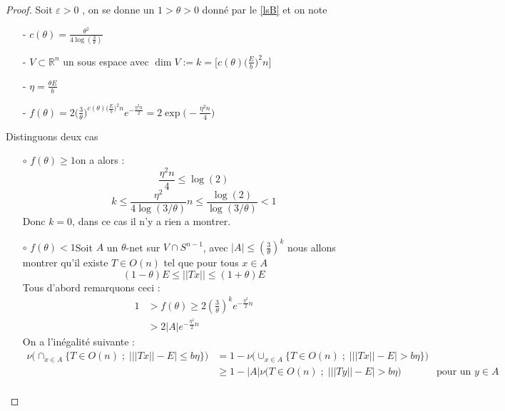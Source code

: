 \documentclass[12pt]{article}
\begin{document}
\begin{proof}
	Soit $\varepsilon>0$ , on se donne un $1>\theta>0$ donné par le \ref{lsB} et on note
	\begin{enumerate}
		\item[-] $c(\theta) = \frac{\theta^2}{4\log(\frac{3}{\theta})} $
		\item[-] $V\subset \mathbb{R}^n$ un sous espace avec $\dim V := k = \big[c(\theta)\big(\frac{E}{b}\big)^2n\big] $
		\item[-] $\eta = \frac{\theta E}{b}$
		\item[-] $f(\theta)=2\big(\frac{3}{\theta}\big)^{c(\theta)\big(\frac{E}{b}\big)^2n}e^{-\frac{\eta^2 n}{2}}=2\exp\big(-\frac{\eta^2n}{4}\big)$
	\end{enumerate}
	
	Distinguons deux cas 
	\begin{enumerate}[leftmargin=\labelsep]
		\item[$\circ$] {$f(\theta)\geq1$}\newline on a alors :
		\begin{equation*}
		\frac{\eta^2n}{4}\leq \log(2)
		\end{equation*}
		\begin{equation*}
		k\leq \frac{\eta^2}{4\log(3/\theta)}n\leq \frac{\log(2)}{\log(3/\theta)}<1
		\end{equation*}
		Donc $k=0$, dans ce cas il n'y a rien a montrer.
		\item[$\circ$] $f(\theta)<1$\newline Soit $A$ un $\theta$-net sur $V\cap S^{n-1}$, avec $|A|\leq(\frac{3}{\theta})^k$ nous allons montrer qu'il existe $T\in O(n)$ tel que pour tous $x\in A$ 
		\begin{equation*}
		(1-\theta) E \leq ||Tx|| \leq (1+ \theta)E
		\end{equation*}
		Tous d'abord remarquons ceci :
		\begin{align*}
		1&>f(\theta)\geq 2(\frac{3}{\theta})^ke^{-\frac{\eta^2}{2}n} \\
		&> 2|A|e^{-\frac{\eta^2}{2}n}
		\end{align*}
		On a l'inégalité suivante : 
		\begin{align*}
		\nu\Big(\cap_{x\in A}\big\{T\in O(n)\; ; \;  \big| ||Tx||-E \big|\leq b\eta\big\}\Big)& = 1-\nu\big(\cup_{x\in A}\big\{T\in O(n)\; ; \; \big| ||Tx||-E \big|>b\eta\big\}\big)& \\
		& \geq 1-|A|\nu\big(T\in O(n)\; ; \; \big| ||Ty||-E \big|>b\eta\big)& \text{pour un $y\in A$}\\

\end{align*}
\end{enumerate}
\end{proof}
\end{document}
